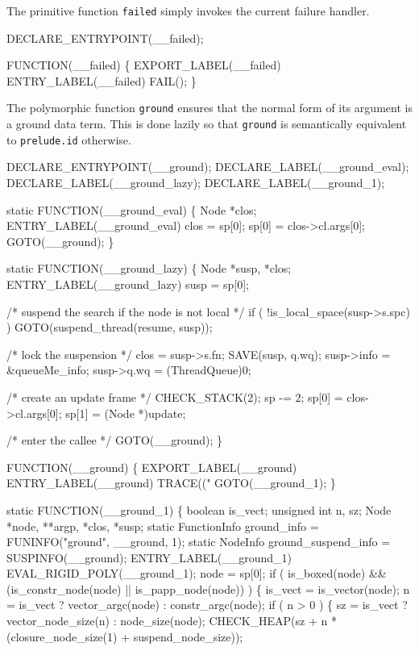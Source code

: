 \nwendcode{}\nwdocspar
The primitive function \texttt{failed} simply invokes the current
failure handler.

\nwenddocs{}\plusendmoddef\nwstartdeflinemarkup{}\nwenddeflinemarkup
DECLARE_ENTRYPOINT(__failed);

FUNCTION(__failed)
\{
    EXPORT_LABEL(__failed)
 ENTRY_LABEL(__failed)
    FAIL();
\}

\nwendcode{}\nwdocspar
The polymorphic function \texttt{ground} ensures that the normal form
of its argument is a ground data term. This is done lazily so that
\texttt{ground} is semantically equivalent to \texttt{prelude.id}
otherwise.

\nwenddocs{}\plusendmoddef\nwstartdeflinemarkup{}\nwenddeflinemarkup
DECLARE_ENTRYPOINT(__ground);
DECLARE_LABEL(__ground_eval);
DECLARE_LABEL(__ground_lazy);
DECLARE_LABEL(__ground_1);

static
FUNCTION(__ground_eval)
\{
    Node *clos;
 ENTRY_LABEL(__ground_eval)
    clos  = sp[0];
    sp[0] = clos->cl.args[0];
    GOTO(__ground);
\}

static
FUNCTION(__ground_lazy)
\{
    Node *susp, *clos;
 ENTRY_LABEL(__ground_lazy)
    susp = sp[0];

    /* suspend the search if the node is not local */
    if ( !is_local_space(susp->s.spc) )
        GOTO(suspend_thread(resume, susp));

    /* lock the suspension */
    clos = susp->s.fn;
    SAVE(susp, q.wq);
    susp->info = &queueMe_info;
    susp->q.wq = (ThreadQueue)0;

    /* create an update frame */
    CHECK_STACK(2);
    sp   -= 2;
    sp[0] = clos->cl.args[0];
    sp[1] = (Node *)update;

    /* enter the callee */
    GOTO(__ground);
\}

FUNCTION(__ground)
\{
    EXPORT_LABEL(__ground)
 ENTRY_LABEL(__ground)
    TRACE(("%
    GOTO(__ground_1);
\}

static
FUNCTION(__ground_1)
\{
    boolean             is_vect;
    unsigned int        n, sz;
    Node                *node, **argp, *clos, *susp;
    static FunctionInfo ground_info         = FUNINFO("ground", __ground, 1);
    static NodeInfo     ground_suspend_info = SUSPINFO(__ground);
 ENTRY_LABEL(__ground_1)
    EVAL_RIGID_POLY(__ground_1);
    node = sp[0];
    if ( is_boxed(node) && (is_constr_node(node) || is_papp_node(node)) )
    \{
        is_vect = is_vector(node);
        n       = is_vect ? vector_argc(node) : constr_argc(node);
        if ( n > 0 )
        \{
            sz = is_vect ? vector_node_size(n) : node_size(node);
            CHECK_HEAP(sz + n * (closure_node_size(1) + suspend_node_size));

